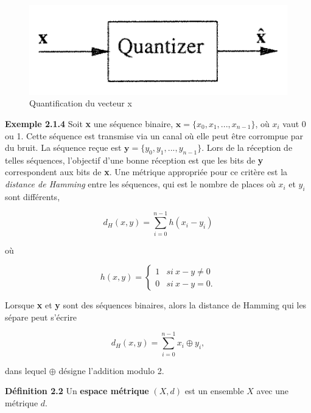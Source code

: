 \documentclass[10pt,twoside,a4paper]{book}
\begin{document}
\begin{figure}[h]
  \center
  \includegraphics[scale=0.6]{fig2.2}
  \caption{Quantification du vecteur x}
\end{figure}

\vspace{4mm}
\noindent
\textbf{Exemple 2.1.4} Soit \textbf{x} une séquence binaire, $\textbf{x} = \{x_0, x_1,...,x_{n-1}\}$, où $x_i$ vaut 0 ou 1. Cette séquence est transmise via un canal où elle peut être 
corrompue par du bruit. La séquence reçue est $\textbf{y} = \{y_0, y_1,...,y_{n-1}\}$. Lors de la réception de telles séquences, l'objectif d'une bonne réception est que les bits de \textbf{y}
correspondent aux bits de \textbf{x}. Une métrique appropriée pour ce critère est la \textit{distance de Hamming} entre les séquences, qui est le nombre de places où $x_i$ et $y_i$ sont différents,

\begin{equation*}
  d_H(x, y) = \sum_{i=0}^{n-1} h(x_i - y_i)
\end{equation*}

\noindent
où

\begin{equation*}
  h(x, y) = \begin{cases} 1 & si \ x - y \neq 0 \\
    0 & si \ x - y = 0.
        \end{cases}
\end{equation*}

\noindent
Lorsque \textbf{x} et \textbf{y} sont des séquences binaires, alors la distance de Hamming qui les sépare peut s'écrire

\begin{equation*}
  d_H(x, y) = \sum_{i=0}^{n-1} x_i \oplus y_i ,
\end{equation*}

\noindent
dans lequel $\oplus$ désigne l'addition modulo 2.


\vspace{4mm}
\noindent
\textbf{Définition 2.2} Un \textbf{espace métrique} $(X, d)$ est un ensemble $X$ avec une métrique $d$.
\end{document}
